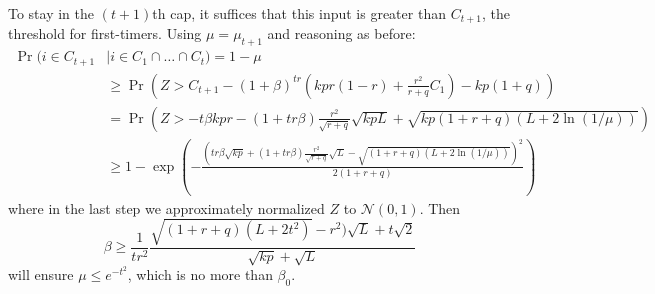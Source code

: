 \documentclass[final,12pt]{colt2022} %
\begin{document}
To stay in the $(t+1)$th cap, it suffices that this input is greater than $C_{t+1}$, the threshold for first-timers. Using $\mu = \mu_{t+1}$ and reasoning as before: \begin{align*}
    \Pr (i \in C_{t+1} &| i \in C_1 \cap \ldots \cap C_t) = 1 - \mu\\
    &\geq \Pr \left(Z > C_{t+1} - (1+\beta)^{tr}\left(kpr(1-r) + \frac{r^2}{r + q}C_1\right) - kp(1+q)\right)\\
    &= \Pr \left(Z > -t\beta kpr - (1+tr\beta)\frac{r^2}{\sqrt{r+q}}\sqrt{kpL} + \sqrt{kp(1+r + q)(L + 2\ln(1/\mu))}\right)\\
    &\geq 1 - \exp\left(-\frac{\left(tr\beta \sqrt{kp} + (1+tr\beta)\frac{r^2}{\sqrt{r+q}}\sqrt{L} - \sqrt{(1+r + q)(L + 2\ln(1/\mu))}\right)^2}{2(1+r+q)}\right)
\end{align*} where in the last step we approximately normalized $Z$ to $\mathcal N(0, 1)$.
Then \[\beta \geq \frac{1}{tr^2}\frac{\sqrt{(1+r+q)(L + 2t^2)} - r^2)\sqrt{L} + t\sqrt{2}}{\sqrt{kp} + \sqrt{L}}\] will ensure $\mu \leq e^{-t^2}$, which is no more than $\beta_0$.
\end{document}
